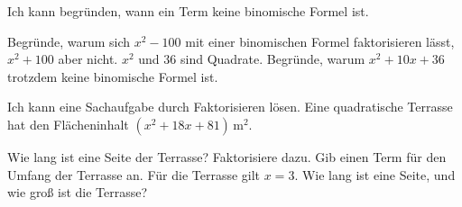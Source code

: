 \begin{aufgabe}{Ich kann begründen, wann ein Term keine binomische Formel ist.}
\begin{teile}
\teil Begründe, warum sich $x^2 - 100$ mit einer binomischen Formel faktorisieren lässt, $x^2 + 100$ aber nicht.
\teil $x^2$ und $36$ sind Quadrate. Begründe, warum $x^2 + 10x + 36$ trotzdem keine binomische Formel ist.
\end{teile}
\end{aufgabe}

\begin{aufgabe}{Ich kann eine Sachaufgabe durch Faktorisieren lösen.}
Eine quadratische Terrasse hat den Flächeninhalt $(x^2 + 18x + 81)$\,m$^2$.


\begin{teile}
\teil Wie lang ist eine Seite der Terrasse? Faktorisiere dazu.
\teil Gib einen Term für den Umfang der Terrasse an.
\teil Für die Terrasse gilt $x = 3$. Wie lang ist eine Seite, und wie groß ist die Terrasse?
\end{teile}
\end{aufgabe}
